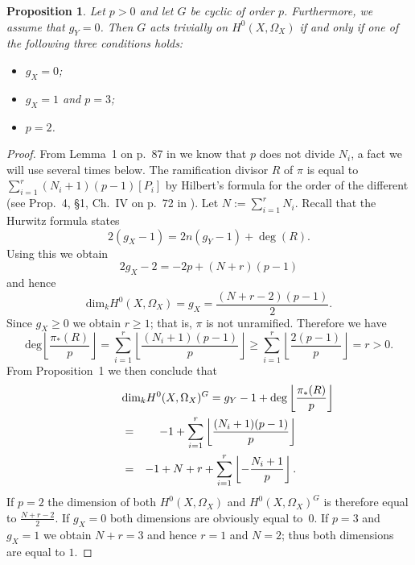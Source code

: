 \documentclass[11pt]{article} %
\newtheorem{prop}{Proposition}
\theoremstyle{remark}\newtheorem*{rem}{Remark}
\begin{document}
  \begin{prop}\label{m=1}
    Let $p  > 0$ and let $G$ be cyclic of order $p$.
    Furthermore, we assume that $g_Y=0$.
    Then $G$ acts trivially on $H^0(X,\Omega_X)$ if and only if one of the following three conditions holds:
	 \begin{itemize}
	  \item $g_X=0$;
	  \item $g_X=1$ and $p=3$;
	  \item $p=2$.
	 \end{itemize}
  \end{prop}
  \begin{proof}
    From Lemma~1 on p.~87 in \cite{Naka} we know that $p$ does not divide $N_i$, a fact we will use several times below. 
    The ramification divisor $R$ of $\pi$ is equal to $\sum_{i=1}^r(N_i+1)(p-1)[P_i]$ by Hilbert's formula for the order of the different (see Prop.~4, \S 1, Ch.~IV on p.~72 in \cite{localfields}). 
    Let $N:= \sum_{i=1}^r N_i$. 
    Recall that the Hurwitz formula states
      \begin{equation}\label{hur}
	2(g_X-1)=2n(g_Y-1) + \deg(R).
      \end{equation}
    Using this we obtain
      \begin{equation}\label{hur2}
	2g_X - 2 = -2p + (N+r)(p-1)
      \end{equation}
    and hence
      \[
	\textrm{dim}_kH^0(X,\Omega_X) = g_X =\frac{(N+r-2)(p-1)}{2}.
      \] 
    Since $g_X \ge 0$ we obtain $r \ge 1$; that is, $\pi$ is not unramified. 
    Therefore we have 
      \[
	\textrm{deg} \left\lfloor \frac{\pi_*(R)}{p} \right\rfloor =
	\sum_{i=1}^r \left\lfloor \frac{(N_i+1)(p-1)}{p}\right\rfloor 
	\ge \sum_{i=1}^r \left\lfloor \frac{2(p-1)}{p}\right\rfloor = r > 0.
      \] 
    From Proposition~1 we then conclude that
      \begin{eqnarray*}
	\lefteqn{\textrm{dim}_k H^0(X,\Omega_X)^G = g_Y -1 + \textrm{deg} \left\lfloor \frac{\pi_*(R)}{p} \right\rfloor}\\
	&=& -1 + \sum_{i=1}^r \left\lfloor \frac{(N_i+1)(p-1)}{p}\right\rfloor\\
	&=& -1 + N +r + \sum_{i=1}^r \left\lfloor -\frac{N_i+1}{p}\right\rfloor.
      \end{eqnarray*}
    If $p=2$ the dimension of both $H^0(X,\Omega_X)$ and $H^0(X,\Omega_X)^G$ is therefore equal to $\frac{N+r-2}{2}$. 
    If $g_X = 0$ both dimensions are obviously equal to~$0$.
    If $p=3$ and $g_X =1$ we obtain $N+r=3$ and hence $r=1$ and $N=2$; thus both dimensions are equal to $1$.

\end{proof}
\end{document}
